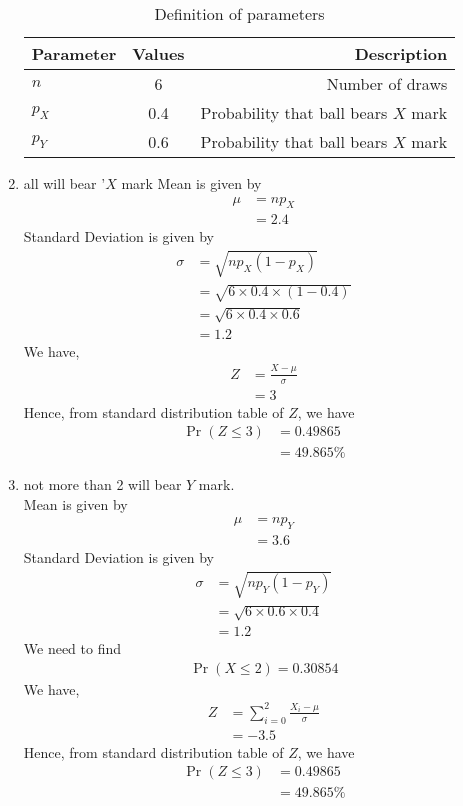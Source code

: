 \documentclass[journal,12pt,onecolumn]{IEEEtran}
\theoremstyle{remark}
\begin{document}
\begin{enumerate}
\begin{table}[!ht]
\centering
\begin{tabular}{|l|c|r|}
    \hline
    Parameter & Values & Description\\
    \hline
    $n$ & 6 & Number of draws\\
    \hline
    $p_X$ & 0.4 & Probability that ball bears $X$ mark \\
    \hline
    $p_Y$ & 0.6 & Probability that ball bears $X$ mark \\
    \hline
\end{tabular}
\caption{Definition of parameters}
\label{tab:gaussian/9/3/17}
\end{table}
\item all will bear '$X$ mark
Mean is given by
\begin{align}
	\mu &= np_X \\
	&= 2.4
\end{align}
Standard Deviation is given by
\begin{align}
	\sigma &= \sqrt{np_X(1 - p_X)}\\
	&= \sqrt{6 \times 0.4 \times (1 - 0.4)} \\
	&= \sqrt{6 \times 0.4 \times 0.6}\\
	&=  1.2
\end{align}
We have,
\begin{align}
	Z &= \frac{X - \mu}{\sigma} \\
	&= 3
\end{align}
Hence, from standard distribution table of $Z$, we have
\begin{align}
	\Pr(Z \le 3) &= 0.49865\\
	&= 49.865\%
\end{align}


\item not more than 2 will bear $Y$ mark.\\
Mean is given by
\begin{align}
	\mu &= np_Y \\
	&= 3.6
\end{align}
Standard Deviation is given by
\begin{align}
	\sigma &= \sqrt{np_Y(1 - p_Y)}\\
	&= \sqrt{6 \times 0.6 \times 0.4}\\
	&=  1.2
\end{align}
We need to find
\begin{align}
	\Pr(X \leq 2) = 0.30854
\end{align}
We have,
\begin{align}
	Z &= \sum_{i=0}^{2}\frac{X_i - \mu}{\sigma} \\
	&= -3.5
\end{align}
Hence, from standard distribution table of $Z$, we have
\begin{align}
	\Pr(Z \le 3) &= 0.49865\\
	&= 49.865\%
\end{align}


\end{enumerate}
\end{document}
